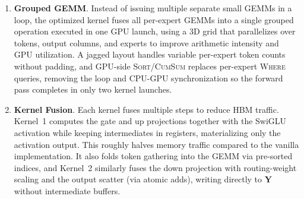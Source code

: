 \documentclass[runningheads]{llncs}
\begin{document}
\begin{enumerate}
  \item \textbf{Grouped GEMM}. %
    Instead of issuing multiple separate small GEMMs
    in a loop, the optimized kernel fuses all per-expert GEMMs into a single grouped operation executed in one GPU launch, using a 3D grid that parallelizes over tokens, output columns, and experts to improve arithmetic intensity and GPU utilization. A jagged layout handles variable per-expert token counts without padding, and GPU-side \textsc{Sort}/\textsc{CumSum} replaces per-expert \textsc{Where} queries, removing the loop and CPU-GPU synchronization so the forward pass completes in only two kernel launches.

  \item \textbf{Kernel Fusion}. %
    Each kernel fuses multiple steps to reduce HBM traffic. Kernel~1 computes the gate and up projections together with the SwiGLU activation while keeping intermediates in registers, materializing only the activation output. This roughly
    halves memory traffic compared to the vanilla implementation. It also folds token gathering into the GEMM via pre-sorted indices, and Kernel~2 similarly fuses the down projection with routing-weight scaling and the output scatter (via atomic adds), writing directly to $\mathbf{Y}$ without intermediate buffers.

\end{enumerate}
\end{document}
